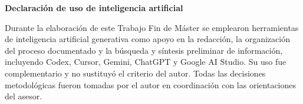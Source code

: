 \documentclass[12pt,a4paper]{article}
\begin{document}
\newpage
\tableofcontents

\newpage
\listoffigures
\newpage
\listoftables

\newpage







\newpage
{}
{}
\noindent\textbf{Declaración de uso de inteligencia artificial}

Durante la elaboración de este Trabajo Fin de Máster se emplearon herramientas
de inteligencia artificial generativa como apoyo en la redacción, la
organización del proceso documentado y la búsqueda y síntesis preliminar de
información, incluyendo Codex, Cursor, Gemini, ChatGPT y Google AI Studio. Su
uso fue complementario y no sustituyó el criterio del autor. Todas las
decisiones metodológicas fueron tomadas por el autor en coordinación con las
orientaciones del asesor.

\newpage


\newpage

 
\end{document}
